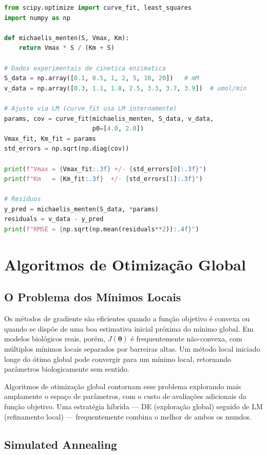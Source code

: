 \begin{lstlisting}[language=Python, caption=Ajuste de Michaelis-Menten via Levenberg-Marquardt]
from scipy.optimize import curve_fit, least_squares
import numpy as np

def michaelis_menten(S, Vmax, Km):
    return Vmax * S / (Km + S)

# Dados experimentais de cinetica enzimatica
S_data = np.array([0.1, 0.5, 1, 2, 5, 10, 20])   # mM
v_data = np.array([0.3, 1.1, 1.8, 2.5, 3.3, 3.7, 3.9])  # umol/min

# Ajuste via LM (curve_fit usa LM internamente)
params, cov = curve_fit(michaelis_menten, S_data, v_data,
                        p0=[4.0, 2.0])
Vmax_fit, Km_fit = params
std_errors = np.sqrt(np.diag(cov))

print(f"Vmax = {Vmax_fit:.3f} +/- {std_errors[0]:.3f}")
print(f"Km   = {Km_fit:.3f}  +/- {std_errors[1]:.3f}")

# Residuos
y_pred = michaelis_menten(S_data, *params)
residuals = v_data - y_pred
print(f"RMSE = {np.sqrt(np.mean(residuals**2)):.4f}")
\end{lstlisting}


\section{Algoritmos de Otimização Global}

\subsection{O Problema dos Mínimos Locais}

Os métodos de gradiente são eficientes quando a função objetivo é convexa ou quando se
dispõe de uma boa estimativa inicial próxima do mínimo global. Em modelos biológicos reais,
porém, $J(\boldsymbol{\theta})$ é frequentemente não-convexa, com múltiplos mínimos locais
separados por barreiras altas. Um método local iniciado longe do ótimo global pode convergir
para um mínimo local, retornando parâmetros biologicamente sem sentido.

Algoritmos de otimização global contornam esse problema explorando mais amplamente o espaço
de parâmetros, com o custo de avaliações adicionais da função objetivo. Uma estratégia
híbrida --- DE (exploração global) seguido de LM (refinamento local) --- frequentemente
combina o melhor de ambos os mundos.

\subsection{Simulated Annealing}


